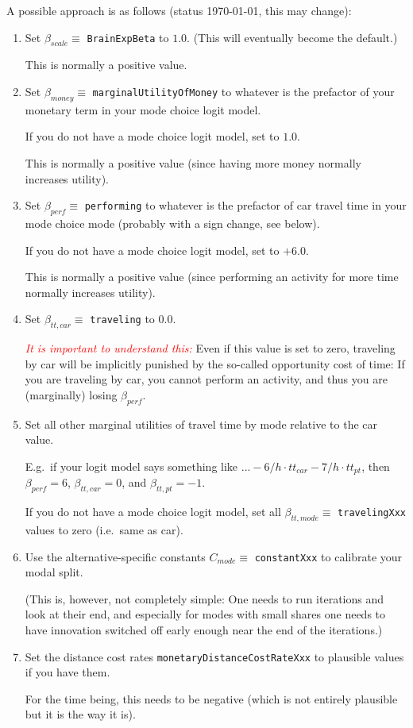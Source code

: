 \documentclass[a4paper,11pt]{report}
\newcommand{\myemph}[1]{\textcolor{red}{\emph{#1}}}
\begin{document}
A possible approach is as follows (status \today, this may change):
\begin{enumerate}

\item Set $\beta_{scale} \equiv$ \verb$BrainExpBeta$ to $1.0$.  (This will eventually become the default.)

This is normally a positive value.

\item Set $\beta_{money} \equiv$ \verb$marginalUtilityOfMoney$ to whatever is the prefactor of your monetary term in your mode choice logit model.

If you do not have a mode choice logit model, set to $1.0$. 

This is normally a positive value (since having more money normally increases utility).

\item Set $\beta_{perf} \equiv$ \verb$performing$ to whatever is the prefactor of car travel time in your mode choice mode (probably with a sign change, see below).

If you do not have a mode choice logit model, set to $+6.0$.

This is normally a positive value (since performing an activity for more time normally increases utility).

\item Set $\beta_{tt,car} \equiv$ \verb$traveling$ to $0.0$.

\myemph{It is important to understand this:}  Even if this value is set to zero, traveling by car will be implicitly punished by the so-called opportunity cost of time: If you are traveling by car, you cannot perform an activity, and thus you are (marginally) losing $\beta_{perf}$.

\item Set all other marginal utilities of travel time by mode relative to the car value.

E.g.\ if your logit model says something like $... -6/h \cdot tt_{car} - 7/h \cdot tt_{pt}$, then $\beta_{perf} = 6$, $\beta_{tt,car} = 0$, and $\beta_{tt,pt} = -1$.

If you do not have a mode choice logit model, set all $\beta_{tt,mode} \equiv$ \verb$travelingXxx$ values to zero (i.e.\ same as car).

\item Use the alternative-specific constants $C_{mode} \equiv$ \verb$constantXxx$ to calibrate your modal split.

(This is, however, not completely simple: One needs to run iterations and look at their end, and especially for modes with small shares one needs to have innovation switched off early enough near the end of the iterations.)

\item Set the distance cost rates \verb$monetaryDistanceCostRateXxx$ to plausible values if you have them.

For the time being, this needs to be negative (which is not entirely plausible but it is the way it is).

\end{enumerate}
\end{document}
